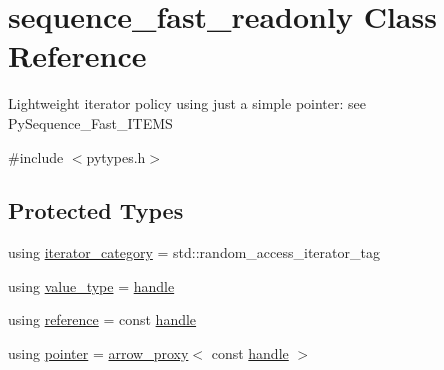 \hypertarget{classsequence__fast__readonly}{}\section{sequence\+\_\+fast\+\_\+readonly Class Reference}
\label{classsequence__fast__readonly}


Lightweight iterator policy using just a simple pointer\+: see {\ttfamily Py\+Sequence\+\_\+\+Fast\+\_\+\+I\+T\+E\+MS}  




{\ttfamily \#include $<$pytypes.\+h$>$}

\subsection*{Protected Types}
\begin{DoxyCompactItemize}
\item 
using \mbox{\hyperlink{classsequence__fast__readonly_ae4b169ed0c818d34dfe03e94880c822a}{iterator\+\_\+category}} = std\+::random\+\_\+access\+\_\+iterator\+\_\+tag
\item 
using \mbox{\hyperlink{classsequence__fast__readonly_ac5ad251551c7938c6a6a7e565b8788d0}{value\+\_\+type}} = \mbox{\hyperlink{classhandle}{handle}}
\item 
using \mbox{\hyperlink{classsequence__fast__readonly_a7b285c12cc5332e8fc7998bcab092fa7}{reference}} = const \mbox{\hyperlink{classhandle}{handle}}
\item 
using \mbox{\hyperlink{classsequence__fast__readonly_acdbb8736f003cfff757d62e6733ebc20}{pointer}} = \mbox{\hyperlink{structarrow__proxy}{arrow\+\_\+proxy}}$<$ const \mbox{\hyperlink{classhandle}{handle}} $>$
\end{DoxyCompactItemize}
